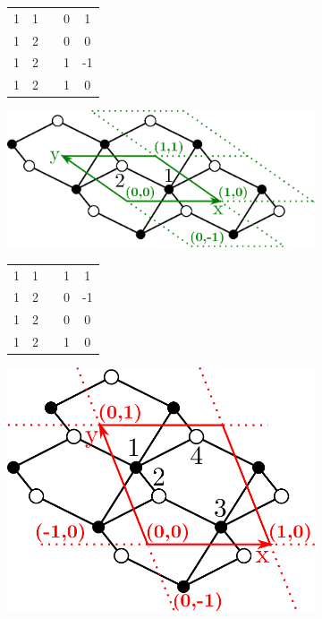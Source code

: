 \documentclass[thesis]{subfiles}
\begin{document}
\begin{otherlanguage}{french}
\begin{figure}[t]
\begin{subfigure}[b]{0.35\linewidth}
		\centering\begin{tabular}{ccccc}
			1&1&&0&1\\
			1&2&&0&0\\
			1&2&&1&-1\\
			1&2&&1&0
		\end{tabular}
		\vspace{-0.5em}
	\end{subfigure}%
	\begin{subfigure}[b]{0.35\linewidth}
		\hspace{-2em}\includegraphics[width=1\linewidth]{figures/topology/cells_other.pdf}
		\vspace{1em}
		
		\centering\begin{tabular}{ccccc}
			1&1&&1&1\\
			1&2&&0&-1\\
			1&2&&0&0\\
			1&2&&1&0
		\end{tabular}
		\vspace{-0.5em}
	\end{subfigure}%
	\begin{subfigure}[b]{0.35\linewidth}
		\centering
		\hspace{-2em}\includegraphics[width=0.63\linewidth]{figures/topology/cells_super.pdf}
		\vspace{-0.5em}
		

\end{subfigure}
\end{figure}
\end{otherlanguage}
\end{document}
